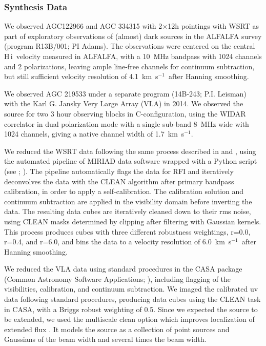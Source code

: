 \documentclass[twocolumn]{aastex6}
\def\kms{km~s$^{-1}$}
\newcommand{\hi}{H{\sc\,i}}
\begin{document}
\subsubsection{Synthesis Data}
\label{data.hi.synthesis}
We observed AGC122966 and AGC 334315 with 2$\times$12h pointings with WSRT as part of exploratory observations of (almost) dark sources in the ALFALFA survey (program R13B/001; PI Adams). 
The observations were centered on the central \hi\ velocity measured in ALFALFA, with a 10~MHz bandpass with 1024 channels and 2 polarizations, leaving ample line-free channels for continuum subtraction, but still sufficient velocity resolution of 4.1~\kms\ after Hanning smoothing. 
  
We observed AGC 219533 under a separate program (14B-243; P.I. Leisman) with the Karl G. Jansky Very Large Array (VLA) in 2014.
We observed the source for two 3 hour observing blocks in C-configuration, using the WIDAR correlator in dual polarization mode with a single sub-band 8~MHz wide with 1024 channels, giving a native channel width of 1.7~\kms. 

We reduced the WSRT data following the same process described in \citet{janowiecki15a} and \citet{leisman16a}, using the automated pipeline of MIRIAD \citep{sault95a} data software wrapped with a Python script (see \citealp{serra12a}; \citealp{wang13a}). The pipeline automatically 
flags the data for RFI and iteratively deconvolves the data with the
CLEAN algorithm after primary bandpass calibration, in order to apply a self-calibration. The calibration solution and continuum subtraction are applied in the visibility domain before inverting the data. The resulting data cubes are iteratively cleaned down to their rms noise, using CLEAN masks determined by clipping after filtering with Gaussian kernels.
This process produces cubes with three different robustness weightings, r=0.0, r=0.4, 
and r=6.0, and bins the data to a velocity resolution of 6.0~\kms\ after Hanning smoothing. %

We reduced the VLA data using standard procedures in the CASA package (Common Astronomy Software Applications; \citealp{mcmullin07a}), including flagging of the visibilities, calibration, and continuum subtraction. We imaged the calibrated uv data following standard procedures, producing data cubes using the CLEAN task in CASA, with a Briggs robust weighting of 0.5. Since we expected the source to be extended, we used the multiscale clean option which  improves localization of extended flux \citep{cornwell08a}. It models the source as a collection of point sources and Gaussians of the beam width and several times the beam width. 
\end{document}
